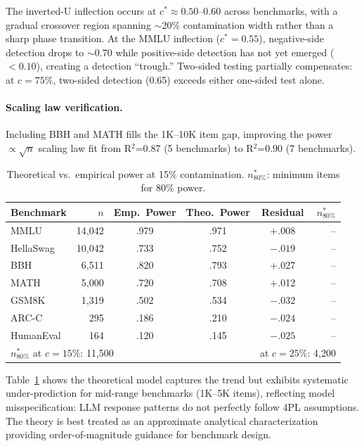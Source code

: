 \documentclass[11pt,a4paper]{article}
\begin{document}
The inverted-U inflection occurs at $c^* \approx 0.50$--0.60 across benchmarks, with a gradual crossover region spanning ${\sim}$20\% contamination width rather than a sharp phase transition. At the MMLU inflection ($c^*{=}0.55$), negative-side detection drops to ${\sim}$0.70 while positive-side detection has not yet emerged ($< 0.10$), creating a detection ``trough.'' Two-sided testing partially compensates: at $c=75\%$, two-sided detection (0.65) exceeds either one-sided test alone.

\paragraph{Scaling law verification.} Including BBH and MATH fills the 1K--10K item gap, improving the power $\propto \sqrt{n}$ scaling law fit from R$^2$=0.87 (5 benchmarks) to R$^2$=0.90 (7 benchmarks).

\begin{table}[t]
\centering
\caption{Theoretical vs.\ empirical power at 15\% contamination. $n^*_{80\%}$: minimum items for 80\% power.}
\label{tab:power_theory}
\small
\begin{tabular}{l r c c c r}
\toprule
Benchmark & $n$ & Emp.\ Power & Theo.\ Power & Residual & $n^*_{80\%}$ \\
\midrule
MMLU & 14,042 & .979 & .971 & +.008 & -- \\
HellaSwag & 10,042 & .733 & .752 & $-.019$ & -- \\
BBH & 6,511 & .820 & .793 & +.027 & -- \\
MATH & 5,000 & .720 & .708 & +.012 & -- \\
GSM8K & 1,319 & .502 & .534 & $-.032$ & -- \\
ARC-C & 295 & .186 & .210 & $-.024$ & -- \\
HumanEval & 164 & .120 & .145 & $-.025$ & -- \\
\midrule
\multicolumn{4}{l}{$n^*_{80\%}$ at $c=15\%$: 11,500} & \multicolumn{2}{r}{at $c=25\%$: 4,200} \\
\bottomrule
\end{tabular}
\end{table}

Table~\ref{tab:power_theory} shows the theoretical model captures the trend but exhibits systematic under-prediction for mid-range benchmarks (1K--5K items), reflecting model misspecification: LLM response patterns do not perfectly follow 4PL assumptions. The theory is best treated as an approximate analytical characterization providing order-of-magnitude guidance for benchmark design.
\end{document}
